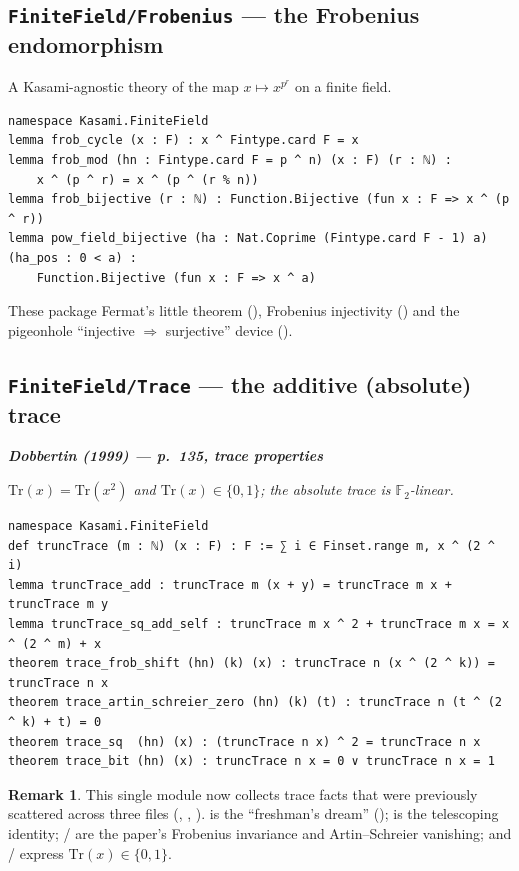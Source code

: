 \documentclass[11pt]{article}
\newenvironment{paperquote}[1]
 {\par\smallskip\noindent
  \def\FrameCommand{\color{quotebar}\vrule width 3pt\hspace{8pt}}%
  \MakeFramed{\advance\hsize-\width \FrameRestore}%
  \small\itshape
  \noindent\normalfont\footnotesize\textbf{\textsf{Dobbertin (1999) --- #1}}\par\nobreak\smallskip\itshape}
 {\endMakeFramed\par\smallskip}
\theoremstyle{definition}
\newtheorem*{remark}{Remark}
\begin{document}
\subsection{\texttt{FiniteField/Frobenius} --- the Frobenius endomorphism}

A Kasami-agnostic theory of the map $x\mapsto x^{p^r}$ on a finite field.

\begin{lstlisting}
namespace Kasami.FiniteField
lemma frob_cycle (x : F) : x ^ Fintype.card F = x
lemma frob_mod (hn : Fintype.card F = p ^ n) (x : F) (r : ℕ) :
    x ^ (p ^ r) = x ^ (p ^ (r % n))
lemma frob_bijective (r : ℕ) : Function.Bijective (fun x : F => x ^ (p ^ r))
lemma pow_field_bijective (ha : Nat.Coprime (Fintype.card F - 1) a) (ha_pos : 0 < a) :
    Function.Bijective (fun x : F => x ^ a)
\end{lstlisting}

These package Fermat's little theorem (), Frobenius
injectivity () and the pigeonhole ``injective
$\Rightarrow$ surjective'' device ().

\subsection{\texttt{FiniteField/Trace} --- the additive (absolute) trace}

\begin{paperquote}{p.~135, trace properties}
$\mathrm{Tr}(x)=\mathrm{Tr}(x^2)$ and $\mathrm{Tr}(x)\in\{0,1\}$; the absolute
trace is $\mathbb F_2$-linear.
\end{paperquote}

\begin{lstlisting}
namespace Kasami.FiniteField
def truncTrace (m : ℕ) (x : F) : F := ∑ i ∈ Finset.range m, x ^ (2 ^ i)
lemma truncTrace_add : truncTrace m (x + y) = truncTrace m x + truncTrace m y
lemma truncTrace_sq_add_self : truncTrace m x ^ 2 + truncTrace m x = x ^ (2 ^ m) + x
theorem trace_frob_shift (hn) (k) (x) : truncTrace n (x ^ (2 ^ k)) = truncTrace n x
theorem trace_artin_schreier_zero (hn) (k) (t) : truncTrace n (t ^ (2 ^ k) + t) = 0
theorem trace_sq  (hn) (x) : (truncTrace n x) ^ 2 = truncTrace n x
theorem trace_bit (hn) (x) : truncTrace n x = 0 ∨ truncTrace n x = 1
\end{lstlisting}

\begin{remark}
This single module now collects trace facts that were previously scattered
across three files (, ,
).   is the ``freshman's dream''
();  is the telescoping identity;
/ are the paper's Frobenius
invariance and Artin--Schreier vanishing; and /
express $\mathrm{Tr}(x)\in\{0,1\}$.
\end{remark}
\end{document}
